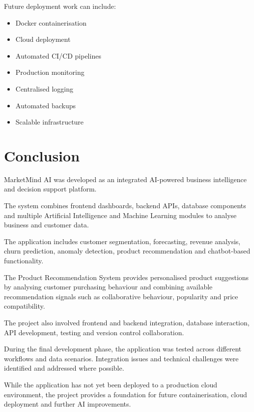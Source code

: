 \documentclass[12pt,a4paper]{report}
\begin{document}
Future deployment work can include:

\begin{itemize}
    \item Docker containerisation
    \item Cloud deployment
    \item Automated CI/CD pipelines
    \item Production monitoring
    \item Centralised logging
    \item Automated backups
    \item Scalable infrastructure
\end{itemize}

\newpage



\chapter{Conclusion}

MarketMind AI was developed as an integrated AI-powered business
intelligence and decision support platform.

The system combines frontend dashboards, backend APIs, database
components and multiple Artificial Intelligence and Machine Learning
modules to analyse business and customer data.

The application includes customer segmentation, forecasting, revenue
analysis, churn prediction, anomaly detection, product recommendation
and chatbot-based functionality.

The Product Recommendation System provides personalised product
suggestions by analysing customer purchasing behaviour and combining
available recommendation signals such as collaborative behaviour,
popularity and price compatibility.

The project also involved frontend and backend integration, database
interaction, API development, testing and version control
collaboration.

During the final development phase, the application was tested across
different workflows and data scenarios. Integration issues and
technical challenges were identified and addressed where possible.

While the application has not yet been deployed to a production cloud
environment, the project provides a foundation for future
containerisation, cloud deployment and further AI improvements.
\end{document}
